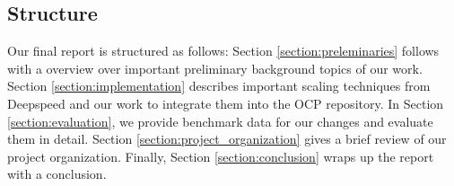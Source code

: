 \subsection{Structure}

Our final report is structured as follows: Section \ref*{section:preleminaries} follows with a overview over 
important preliminary background topics of our work. Section \ref*{section:implementation} describes important 
scaling techniques from Deepspeed and our work to integrate them into the OCP repository. In Section 
\ref*{section:evaluation}, we provide benchmark data for our changes and evaluate them in detail. Section 
\ref*{section:project_organization} gives a brief review of our project organization. Finally, Section 
\ref*{section:conclusion} wraps up the report with a conclusion.